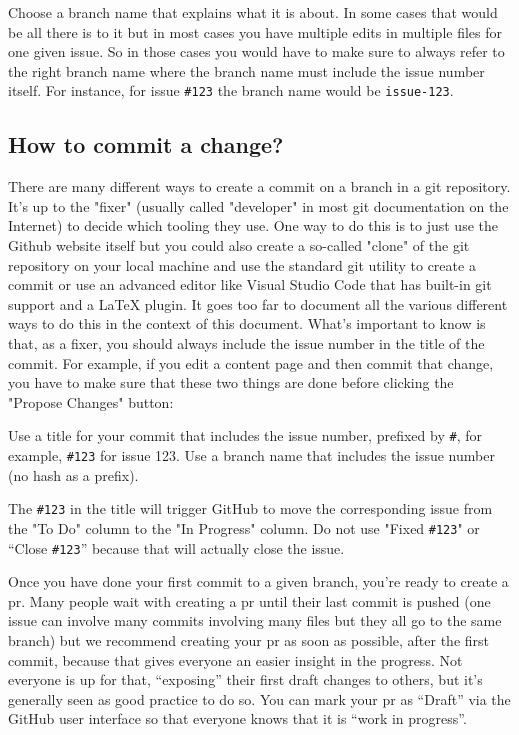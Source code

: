 Choose a branch name that explains what it is about. 
In some cases that would be all there is to it but in most cases you 
have multiple edits in multiple files for one given issue. 
So in those cases you would have to make sure to always refer to 
the right branch name where the branch name must include the 
issue number itself. 
For instance, for issue \texttt{\#123} the branch name would 
be \texttt{issue-123}.

\subsection{How to commit a change?}
\label{subsec:ekg-mm-process-how-to-commit}

There are many different ways to create a commit on a branch in a 
git repository. It’s up to the "fixer" (usually called "developer"
in most git documentation on the Internet) to decide which
tooling they use.
One way to do this is to just use the Github website itself but you
could also create a so-called "clone" of the git repository on your 
local machine and use the standard git utility to create a commit or 
use an advanced editor like Visual Studio Code that has built-in 
git support and a LaTeX plugin. 
It goes too far to document all the various different ways to do this 
in the context of this document.
What’s important to know is that, as a fixer, you should always include
the issue number in the title of the commit. 
For example, if you edit a content page and then commit that change, 
you have to make sure that these two things are done before clicking 
the "Propose Changes" button:

Use a title for your commit that includes the issue number, 
prefixed by \texttt{\#}, for example, \texttt{\#123} for issue 123.
Use a branch name that includes the issue number (no hash as a prefix).

The \texttt{\#123} in the title will trigger GitHub to move the
corresponding issue from the "To Do" column to the "In Progress" column.
Do not use "Fixed \texttt{\#123}" or “Close \texttt{\#123}” because that 
will actually close the issue.

Once you have done your first commit to a given branch, you’re ready to
create a \gls{pr}. 
Many people wait with creating a \gls{pr} until their last commit is pushed
(one issue can involve many commits involving many files but they all 
go to the same branch) but we recommend creating your \gls{pr} as soon as possible, 
after the first commit, because that gives everyone an easier insight 
in the progress. Not everyone is up for that, “exposing” their 
first draft changes to others, but it’s generally seen as 
good practice to do so. 
You can mark your \gls{pr} as “Draft” via the GitHub user interface so that 
everyone knows that it is “work in progress”.

